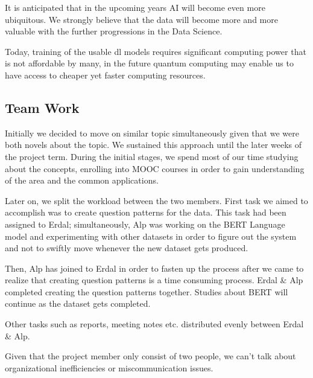 \documentclass{mefsdp}
\begin{document}
	It is anticipated that in the upcoming years AI will become even more ubiquitous. We strongly believe that the data will become more and more valuable with the further progressions in the Data Science. \newline \par
	
	Today, training of the usable \gls{dl} models requires significant computing power that is not affordable by many, in the future quantum computing may enable us to have access to cheaper yet faster computing resources. \newline \par
	
	\subsection{Team Work}
	Initially we decided to move on similar topic simultaneously given that we were both novels about the topic. We sustained this approach until the later weeks of the project term. During the initial stages, we spend most of our time studying about the concepts, enrolling into MOOC courses in order to gain understanding of the area and the common applications. \newline \par
	
	Later on, we split the workload between the two members. First task we aimed to accomplish was to create question patterns for the data. This task had been assigned to Erdal; simultaneously, Alp was working on the BERT Language model and experimenting with other datasets in order to figure out the system and not to swiftly move whenever the new dataset gets produced. \newline \par
	
	Then, Alp has joined to Erdal in order to fasten up the process after we came to realize that creating question patterns is a time consuming process. Erdal \& Alp completed creating the question patterns together. Studies about BERT will continue as the dataset gets completed.\newline \par
	
	Other tasks such as reports, meeting notes etc. distributed evenly between Erdal \& Alp.\newline \par
	
	Given that the project member only consist of two people, we can't talk about organizational inefficiencies or miscommunication issues. 
	
\end{document}
